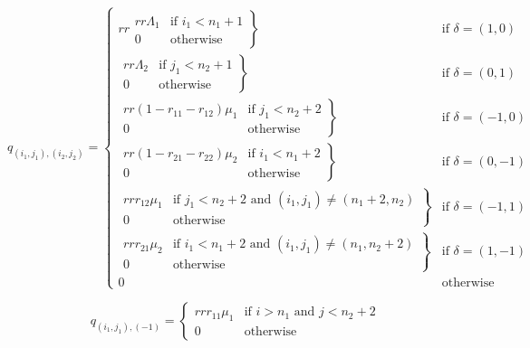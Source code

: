 \documentclass{article}
\numberwithin{equation}{section}
\begin{document}
\begin{equation}
  q_{(i_1, j_1),(i_2, j_2)} = \left\{
  \begin{matrix}{rr}
    \left. \begin{matrix}{rr}
      \Lambda_1 & \text{if } i_1 < n_1 + 1 \\
      0 & \text{otherwise}
    \end{matrix} \right\} & \text{if } \delta = (1, 0) \\
    \left. \begin{matrix}{rr}
      \Lambda_2 & \text{if } j_1 < n_2 + 1 \\
      0 & \text{otherwise}
    \end{matrix} \right\} & \text{if } \delta = (0, 1) \\
    \left. \begin{matrix}{rr}
      (1 - r_{11} - r_{12})\mu_1 & \text{if } j_1 < n_2 + 2 \\
      0 & \text{otherwise}
    \end{matrix} \right\} & \text{if } \delta = (-1, 0) \\
    \left. \begin{matrix}{rr}
      (1 - r_{21} - r_{22})\mu_2 & \text{if } i_1 < n_1 + 2 \\
      0 & \text{otherwise}
    \end{matrix} \right\} & \text{if } \delta = (0, -1) \\
    \left. \begin{matrix}{rr}
      r_{12}\mu_1 & \text{if } j_1 < n_2 + 2 \text{ and } (i_1, j_1) \neq (n_1 + 2, n_2) \\
      0 & \text{otherwise}
    \end{matrix} \right\} & \text{if } \delta = (-1, 1) \\
    \left. \begin{matrix}{rr}
      r_{21}\mu_2 & \text{if } i_1 < n_1 + 2 \text{ and } (i_1, j_1) \neq (n_1, n_2 + 2) \\
      0 & \text{otherwise}
    \end{matrix} \right\} & \text{if } \delta = (1, -1) \\
    0 & \text{otherwise}
  \end{matrix} \right.
\end{equation}

\begin{equation}\label{equ:todeadlock2}
  q_{(i_1, j_1), (-1)} = \left\{
  \begin{matrix}{rr}
    r_{11}\mu_1 & \text{if } i > n_1 \text{ and } j < n_2 + 2 \\
    0 & \text{otherwise}
  \end{matrix}
  \right.
\end{equation}
\end{document}
